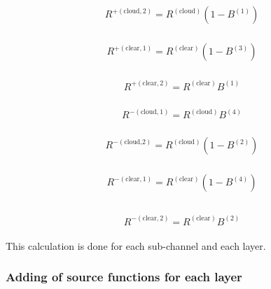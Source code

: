 \begin{eqnarray}
\begin{array}{l}
R^{+(\text {cloud}, 2)}=R^{(\text {cloud})}\left(1-B^{(1)}\right)
\end{array}
\end{eqnarray}

\begin{eqnarray}
\begin{array}{l}
R^{+(\text {clear}, 1)}=R^{(\text {clear})}\left(1-B^{(3)}\right)
\end{array}
\end{eqnarray}

\begin{eqnarray}
\begin{array}{l}
R^{+(\text {clear}, 2)}=R^{(\text {clear})} B^{(1)}
\end{array}
\end{eqnarray}

\begin{eqnarray}
\begin{array}{l}
R^{-(\text {cloud}, 1)}=R^{(\text {cloud})} B^{(4)}
\end{array}
\end{eqnarray}

\begin{eqnarray}
\begin{array}{l}
R^{-(\text {cloud,2})}=R^{(\text {cloud})}\left(1-B^{(2)}\right)
\end{array}
\end{eqnarray}

\begin{eqnarray}
\begin{array}{l}
R^{-(\text {clear}, 1)}=R^{(\text {clear})}\left(1-B^{(4)}\right) \\
\end{array}
\end{eqnarray}

\begin{eqnarray}
\begin{array}{l}
R^{-(\text {clear}, 2)}=R^{(\text {clear})} B^{(2)}
\end{array}
\end{eqnarray}

This calculation is done for each sub-channel and each layer.

\hypertarget{adding-of-source-functions-for-each-layer}{%
\subsubsection{Adding of source functions for each
layer}\label{adding-of-source-functions-for-each-layer}}


